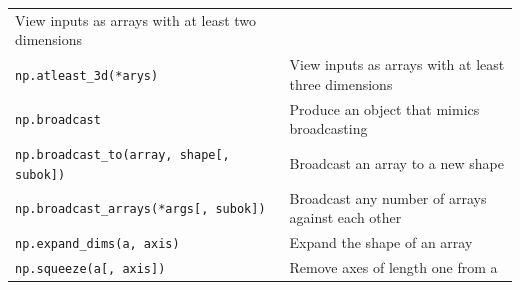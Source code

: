 \documentclass[a4paper,11pt]{book}
\begin{document}
\begin{appendices}
\begin{table}
\begin{tabular}{lp{13cm}}
                View inputs as arrays with at least two dimensions\\
                \texttt{np.atleast\_3d(*arys)}&
                View inputs as arrays with at least three dimensions\\
                \texttt{np.broadcast}&
                Produce an object that mimics broadcasting\\
                \texttt{np.broadcast\_to(array, shape[, subok])}&
                Broadcast an array to a new shape\\
                \texttt{np.broadcast\_arrays(*args[, subok])}&
                Broadcast any number of arrays against each other\\
                \texttt{np.expand\_dims(a, axis)}&
                Expand the shape of an array\\
                \texttt{np.squeeze(a[, axis])}&
                Remove axes of length one from a\\
		\midrule
	\end{tabular}
\end{table}


\end{appendices}
\end{document}
